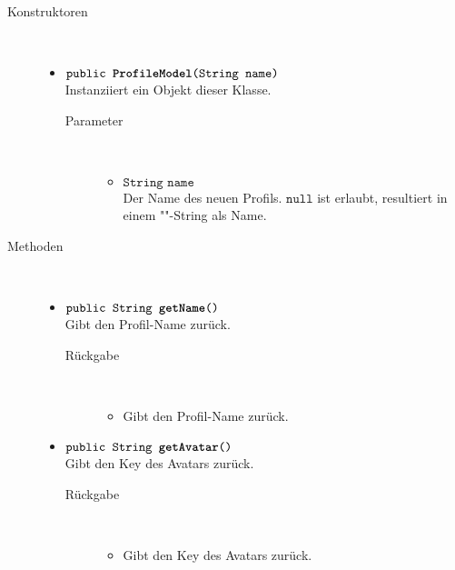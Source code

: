 \begin{description}
\item[Konstruktoren] \hfill \\
	\vspace{-.8cm}
	\begin{itemize}
		\item $\texttt{public \textbf{ProfileModel}(String name)}$ \\ Instanziiert ein Objekt dieser Klasse.
		\begin{description}
			\item[Parameter] \hfill \\
			\vspace{-.8cm}
			\begin{itemize}
				\item $\texttt{String name}$ \\ Der Name des neuen Profils. $\texttt{null}$ ist erlaubt, resultiert in einem ""-String als Name.
			\end{itemize}
		\end{description}
	\end{itemize}
	
\item[Methoden] \hfill \\
	\vspace{-.8cm}
	\begin{itemize}
		\item $\texttt{public String \textbf{getName}()}$ \\ Gibt den Profil-Name zurück.
		\begin{description}
			\item[Rückgabe] \hfill \\
			\vspace{-.8cm}
			\begin{itemize}
				\item Gibt den Profil-Name zurück.
			\end{itemize}
		\end{description}
		
		\item $\texttt{public String \textbf{getAvatar}()}$ \\ Gibt den Key des Avatars zurück.
		\begin{description}
			\item[Rückgabe] \hfill \\
			\vspace{-.8cm}
			\begin{itemize}
				\item Gibt den Key des Avatars zurück.
			\end{itemize}
		\end{description}
		

\end{itemize}
\end{description}
